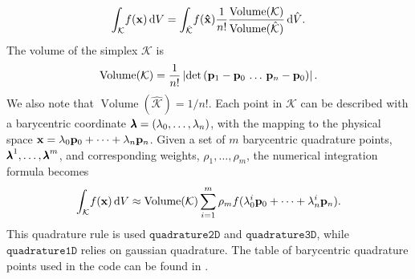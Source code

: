\begin{equation}
	\int_{\mathcal{K}} \! f(\vb{x}) \, \mathrm{d}V = \int_{\mathcal{\hat{K}}} \! f(\vb{\hat{x}})\frac{1}{n!}\frac{\operatorname{Volume}(\mathcal{K})}{\operatorname{Volume}(\mathcal{\hat{K}})}\, \mathrm{d}\hat{V}.
\end{equation}
The volume of the simplex $\mathcal{K}$ is \cite{wiki_simplex}
\begin{equation}
 	\operatorname{Volume}(\mathcal{K}) = \frac{1}{n!}\left|\operatorname{det}\left(\vb{p}_1-\vb{p}_0\,\dots\,\vb{p}_n-\vb{p}_0\right)\right|.
 \end{equation} 
We also note that $\operatorname{Volume}(\mathcal{\hat{K}}) = 1/n!$. Each point in $\mathcal{K}$ can be described with a barycentric coordinate $\vb{\pmb{\lambda}} = \left(\lambda_0,\dots,\lambda_{n}\right)$, with the mapping to the physical space $\vb{x} = \lambda_0\vb{p}_0 + \dots + \lambda_n\vb{p}_n$. Given a set of $m$ barycentric quadrature points, $\vb{\pmb{\lambda}}^1,\dots,\vb{\pmb{\lambda}}^m$, and corresponding weights, $\rho_1,\dots,\rho_m$, the numerical integration formula becomes
\begin{equation}
	\int_{\mathcal{K}} \! f(\vb{x}) \, \mathrm{d}V \approx \operatorname{Volume}(\mathcal{K})\sum_{i = 1}^m \rho_m f(\lambda_0^i\vb{p}_0 +\dots + \lambda_n^i\vb{p}_n).
\end{equation}
This quadrature rule is used $\texttt{quadrature2D}$ and $\texttt{quadrature3D}$, while $\texttt{quadrature1D}$ relies on gaussian quadrature. The table of barycentric quadrature points used in the code can be found in \cite{tma4220}.
